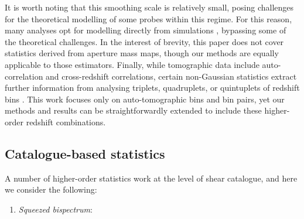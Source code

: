 It is worth noting that this smoothing scale is relatively small, posing challenges for  the theoretical modelling of some probes within this regime.
For this reason, many analyses opt for modelling directly from simulations \citep[see][]{HD21, DESY3_Zuercher, HSCY1_peaks_sims}, bypassing some of the theoretical challenges.
In the interest of brevity, this paper does not cover statistics derived from aperture mass maps, though our methods are equally applicable to those estimators.
Finally, while tomographic \gtwopcf data include auto-correlation and cross-redshift correlations, certain non-Gaussian statistics extract further information from analysing triplets, quadruplets, or quintuplets of redshift bins \citep{Martinet20}.
This work focuses only on auto-tomographic bins and bin pairs, yet our methods and results can be straightforwardly extended to include these higher-order redshift combinations.


 
 
\subsection{Catalogue-based statistics}

A number of higher-order statistics work at the level of shear catalogue,  and here we consider the following:
\begin{enumerate}

\item {\it Squeezed bispectrum}: 
\end{enumerate}

